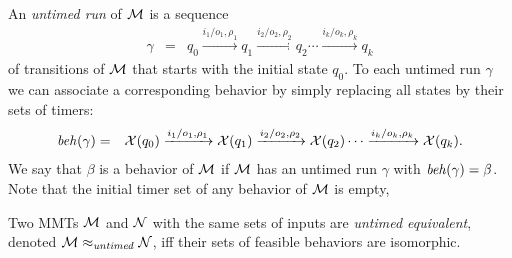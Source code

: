 An \emph{untimed run} of ${\cal M}$ is a sequence
\begin{eqnarray*}
\gamma & = & q_0 \xrightarrow{i_1/o_1, \rho_1} q_1  \xrightarrow{i_2/o_2, \rho_2} q_2 \cdots \xrightarrow{i_k/o_k, \rho_k} q_k
\end{eqnarray*}
of transitions of ${\cal M}$ that starts with the initial state $q_0$. 
To each untimed run $\gamma$ we can associate a corresponding behavior by simply replacing all
states by their sets of timers:
\begin{eqnarray*}
\mathit{beh}(\gamma) & = & \mathcal{X}(q_0) \xrightarrow{i_1/o_1, \rho_1} \mathcal{X}(q_1)  \xrightarrow{i_2/o_2, \rho_2} \mathcal{X}(q_2) \cdots \xrightarrow{i_k/o_k, \rho_k} \mathcal{X}(q_k).
\end{eqnarray*}
We say that $\beta$ is a behavior of ${\cal M}$ if ${\cal M}$ has an untimed run $\gamma$ with $\mathit{beh}(\gamma) = \beta$.
Note that the initial timer set of any behavior of ${\cal M}$ is empty,

Two MMTs ${\cal M}$ and ${\cal N}$ with the same sets of inputs are \emph{untimed equivalent}, denoted ${\cal M} \approx_{\mathit{untimed}} {\cal N}$, iff their sets of feasible behaviors are isomorphic.


